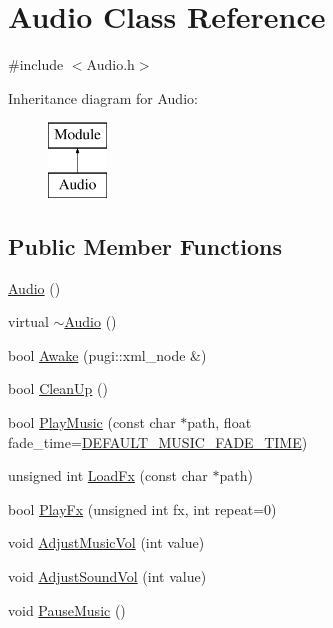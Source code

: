 \hypertarget{class_audio}{}\section{Audio Class Reference}
\label{class_audio}


{\ttfamily \#include $<$Audio.\+h$>$}

Inheritance diagram for Audio\+:\begin{figure}[H]
\begin{center}
\leavevmode
\includegraphics[height=2.000000cm]{class_audio}
\end{center}
\end{figure}
\subsection*{Public Member Functions}
\begin{DoxyCompactItemize}
\item 
\mbox{\hyperlink{class_audio_aa9d3935a2b91ab4b825bc0cb05f245ea}{Audio}} ()
\item 
virtual \mbox{\hyperlink{class_audio_ae8f54deecb5f48511aaab469e80294d6}{$\sim$\+Audio}} ()
\item 
bool \mbox{\hyperlink{class_audio_a642fa346ae3e6658ad8c6b06c1da1f19}{Awake}} (pugi\+::xml\+\_\+node \&)
\item 
bool \mbox{\hyperlink{class_audio_a15ae1aa195c9c5f754850e5884bd2dc9}{Clean\+Up}} ()
\item 
bool \mbox{\hyperlink{class_audio_a66356dc0e001dde301e79aac0ec76895}{Play\+Music}} (const char $\ast$path, float fade\+\_\+time=\mbox{\hyperlink{_audio_8h_a06c542270f4bcee6a472e015d5ab8d08}{D\+E\+F\+A\+U\+L\+T\+\_\+\+M\+U\+S\+I\+C\+\_\+\+F\+A\+D\+E\+\_\+\+T\+I\+ME}})
\item 
unsigned int \mbox{\hyperlink{class_audio_acd67418cbdb4aee0da2ca9592d3b38ea}{Load\+Fx}} (const char $\ast$path)
\item 
bool \mbox{\hyperlink{class_audio_a2903ef06d3f8b877a268074d3671e1ca}{Play\+Fx}} (unsigned int fx, int repeat=0)
\item 
void \mbox{\hyperlink{class_audio_a8bcf0de9b914141f53e10e920d8f6d72}{Adjust\+Music\+Vol}} (int value)
\item 
void \mbox{\hyperlink{class_audio_a195c13bc06fa77dbd54bda907ff6627f}{Adjust\+Sound\+Vol}} (int value)
\item 
void \mbox{\hyperlink{class_audio_a46bedb8e99e838dbf37bb164a4296e47}{Pause\+Music}} ()
\end{DoxyCompactItemize}
